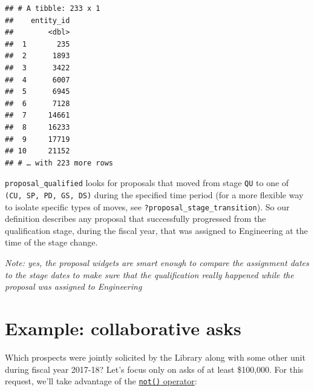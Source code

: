 \documentclass[]{book}
\newenvironment{Shaded}{\begin{snugshade}}{\end{snugshade}}
\newcommand{\DataTypeTok}[1]{\textcolor[rgb]{0.13,0.29,0.53}{#1}}
\newcommand{\DecValTok}[1]{\textcolor[rgb]{0.00,0.00,0.81}{#1}}
\newcommand{\KeywordTok}[1]{\textcolor[rgb]{0.13,0.29,0.53}{\textbf{#1}}}
\newcommand{\NormalTok}[1]{#1}
\newcommand{\OperatorTok}[1]{\textcolor[rgb]{0.81,0.36,0.00}{\textbf{#1}}}
\newcommand{\StringTok}[1]{\textcolor[rgb]{0.31,0.60,0.02}{#1}}
\begin{document}
\begin{verbatim}
## # A tibble: 233 x 1
##    entity_id
##        <dbl>
##  1       235
##  2      1893
##  3      3422
##  4      6007
##  5      6945
##  6      7128
##  7     14661
##  8     16233
##  9     17719
## 10     21152
## # … with 223 more rows
\end{verbatim}

\texttt{proposal\_qualified} looks for proposals that moved from stage \texttt{QU} to one of \texttt{(CU,\ SP,\ PD,\ GS,\ DS)} during the specified time period (for a more flexible way to isolate specific types of moves, see \texttt{?proposal\_stage\_transition}). So our definition describes any proposal that successfully progressed from the qualification stage, during the fiscal year, that was assigned to Engineering at the time of the stage change.

\emph{Note: yes, the proposal widgets are smart enough to compare the assignment dates to the stage dates to make sure that the qualification really happened while the proposal was assigned to Engineering}

\hypertarget{example-collaborative-asks}{%
\section{Example: collaborative asks}\label{example-collaborative-asks}}

Which prospects were jointly solicited by the Library along with some other unit during fiscal year 2017-18? Let's focus only on asks of at least \$100,000. For this request, we'll take advantage of the \protect\hyperlink{widget-not-operator}{\texttt{not()} operator}:

\begin{Shaded}
\end{Shaded}
\end{document}

